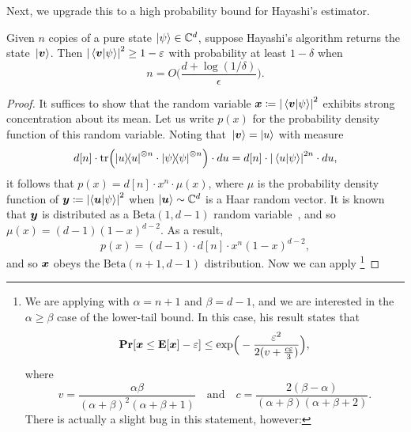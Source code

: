 \documentclass{article}
\begin{document}
Next,
we upgrade this to a high probability bound for Hayashi's estimator.
\begin{proposition}
Given $n$ copies of a pure state $\ket{\psi} \in \mathbb C^d$,
suppose Hayashi's algorithm returns the state $\ket*{\boldsymbol{v}}$. Then $\abs{\braket*{\boldsymbol{v}}{\psi}}^2 \geq 1 - \varepsilon$ with probability at least $1 - \delta$ when
\begin{equation*}
    n = O\Big(\frac{d + \log(1/\delta)}{\epsilon}\Big).
\end{equation*}
\end{proposition}
\begin{proof}
It suffices to show that the random variable ${\boldsymbol{x}} \coloneqq \abs{\braket*{\boldsymbol{v}}{\psi}}^2$ exhibits strong concentration about its mean.
Let us write $p(x)$ for the probability density function of this random variable.
Noting that $\ket*{\boldsymbol{v}} = \ket{u}$ with measure
\begin{equation*}
    d[n] \cdot \tr(\ketbra{u}^{\otimes n} \cdot \ketbra{\psi}^{\otimes n}) \cdot du
    =
    d[n] \cdot \abs{\braket*{u}{\psi}}^{2n} \cdot du,
\end{equation*}
it follows that $p(x) = d[n] \cdot x^n \cdot \mu(x)$, where $\mu$ is the probability density function of $\boldsymbol{y} \coloneqq \abs{\braket{\boldsymbol{u}}{\psi}}^2$ when $\ket{\boldsymbol{u}} \sim \mathbb C^d$ is a Haar random vector.
It is known that $\boldsymbol{y}$ is distributed as a $\mathrm{Beta}(1, d-1)$ random variable~\cite[Eq.\ (7)]{ZS00},
and so $\mu(x) = (d-1)(1-x)^{d-2}$.
As a result,
\begin{equation*}
    p(x) = (d-1)\cdot d[n] \cdot x^n (1-x)^{d-2},
\end{equation*}
and so ${\boldsymbol{x}}$ obeys the $\mathrm{Beta}(n+1, d-1)$ distribution.
Now we can apply \cite[Theorem 1]{Sko23}\footnote{We are applying \cite[Theorem 1]{Sko23} with $\alpha = n+1$ and $\beta = d-1$, and we are interested in the $\alpha \geq \beta$ case of the lower-tail bound. In this case, his result states that
\begin{equation}\label{eq:can-i-cite-in-a-footnote}
    \mathop{\bf Pr\/}[{\boldsymbol{x}} \leq \mathop{\bf E\/}[{\boldsymbol{x}}] - \varepsilon]
    \leq \mathrm{exp}\Big(- \frac{\varepsilon^2}{2(v + \frac{c\varepsilon}{3})}\Big),
\end{equation}
where
\begin{equation*}
    v = \frac{\alpha \beta}{(\alpha+\beta)^2 (\alpha+\beta+1)} \quad \text{and} \quad c = \frac{2(\beta  - \alpha)}{(\alpha+\beta) (\alpha+\beta+2)}.
\end{equation*}
There is actually a slight bug in this statement, however:
}
\end{proof}
\end{document}
